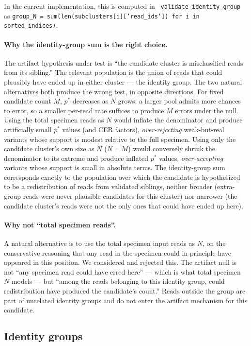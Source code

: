 \documentclass[11pt]{article}
\begin{document}
In the current implementation, this is computed in
\texttt{\_validate\_identity\_group} as
\texttt{group\_N = sum(len(subclusters[i]['read\_ids']) for i in sorted\_indices)}.

\paragraph{Why the identity-group sum is the right choice.} The artifact
hypothesis under test is ``the candidate cluster is misclassified reads from
its sibling.'' The relevant population is the union of reads that could
plausibly have ended up in either cluster --- the identity group. The two
natural alternatives both produce the wrong test, in opposite directions. For
fixed candidate count $M$, $p^*$ decreases as $N$ grows: a larger pool admits
more chances to error, so a smaller per-read rate suffices to produce $M$
errors under the null. Using the total specimen reads as $N$ would inflate
the denominator and produce artificially small $p^*$ values (and CER
factors), \emph{over-rejecting} weak-but-real variants whose support is
modest relative to the full specimen. Using only the candidate cluster's own
size as $N$ ($N = M$) would conversely shrink the denominator to its
extreme and produce inflated $p^*$ values, \emph{over-accepting} variants
whose support is small in absolute terms. The identity-group sum corresponds
exactly to the population over which the candidate is hypothesized to be a
redistribution of reads from validated siblings, neither broader (extra-group
reads were never plausible candidates for this cluster) nor narrower (the
candidate cluster's reads were not the only ones that could have ended up
here).

\paragraph{Why not ``total specimen reads''.} A natural alternative is to use
the total specimen input reads as $N$, on the conservative reasoning that any
read in the specimen could in principle have appeared in this position. We
considered and rejected this. The artifact null is not ``any specimen read
could have erred here'' --- which is what total specimen $N$ models --- but
``among the reads belonging to this identity group, could redistribution have
produced the candidate's count.'' Reads outside the group are part of
unrelated identity groups and do not enter the artifact mechanism for this
candidate.

\subsection{Identity groups}
\label{sec:identity_groups}
\end{document}
